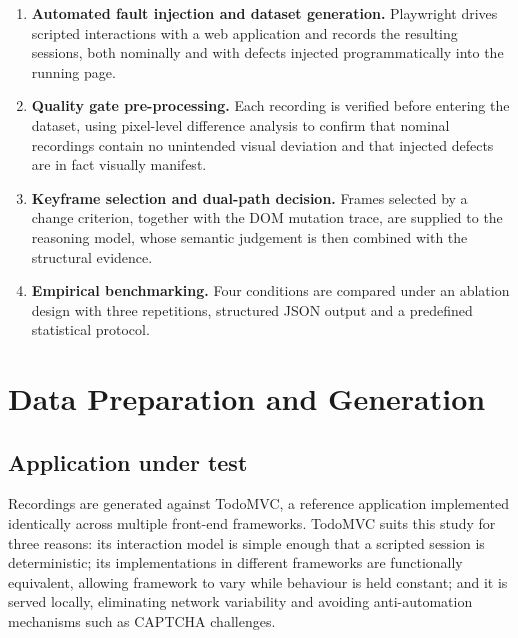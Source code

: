 \begin{enumerate}
  \item \textbf{Automated fault injection and dataset generation.}
    Playwright drives scripted interactions with a web application and
    records the resulting sessions, both nominally and with defects
    injected programmatically into the running page.
  \item \textbf{Quality gate pre-processing.} Each recording is verified
    before entering the dataset, using pixel-level difference analysis to
    confirm that nominal recordings contain no unintended visual deviation
    and that injected defects are in fact visually manifest.
  \item \textbf{Keyframe selection and dual-path decision.} Frames
    selected by a change criterion, together with the DOM mutation trace,
    are supplied to the reasoning model, whose semantic judgement is then
    combined with the structural evidence.
  \item \textbf{Empirical benchmarking.} Four conditions are compared
    under an ablation design with three repetitions, structured JSON
    output and a predefined statistical protocol.
\end{enumerate}



\section{Data Preparation and Generation}
\label{sec:data_prep}

\subsection{Application under test}

Recordings are generated against TodoMVC, a reference application
implemented identically across multiple front-end frameworks. TodoMVC
suits this study for three reasons: its interaction model is simple enough
that a scripted session is deterministic; its implementations in different
frameworks are functionally equivalent, allowing framework to vary while
behaviour is held constant; and it is served locally, eliminating network
variability and avoiding anti-automation mechanisms such as CAPTCHA
challenges.

